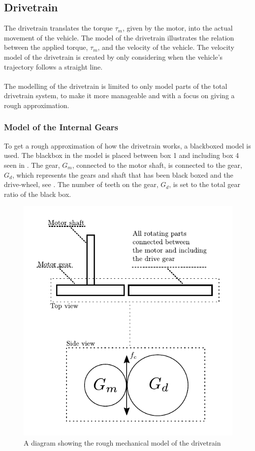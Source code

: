 \subsection{Drivetrain}\label{Drivetrain}

The drivetrain translates the torque $\tau_m$, given by the motor, into the actual movement of the vehicle. The model of the drivetrain illustrates the relation between the applied torque, $\tau_m$, and the velocity of the vehicle. The velocity model of the drivetrain is created by only considering when the vehicle's trajectory follows a straight line.\\\\
%
The modelling of the drivetrain is limited to only model parts of the total drivetrain system, to make it more manageable and with a focus on giving a rough approximation.
\subsubsection{Model of the Internal Gears}\label{BlackBoxModel}
To get a rough approximation of how the drivetrain works, a blackboxed model is used. The blackbox in the model is placed between box 1 and including box 4 seen in  . The gear, $G_m$, connected to the motor shaft, is connected to the gear, $G_d$, which represents the gears and shaft that has been black boxed and the drive-wheel, see . The number of teeth on the gear, $G_d$, is set to the total gear ratio of the black box.

\begin{figure}[H]
	\centering
	\includegraphics[scale=1]{figures/mechanicalDrawingSystem.pdf}
	\caption{A diagram showing the rough mechanical model of the drivetrain}
	\label{fig:DrivetrainMechanicalModel}
\end{figure}

